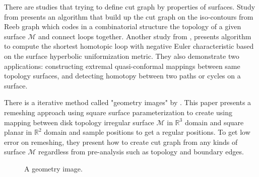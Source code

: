 \documentclass[a4paper,twoside]{article}
\begin{document}
There are studies that trying to define cut graph by properties of surfaces. Study from \cite{Patane:2007:FCB:1224804.1224947} presents an algorithm that build up the cut graph on the iso-contours from Reeb graph which codes in a combinatorial structure the topology of a given surface $\mathscr{M}$ and connect loops together. Another study from \cite{Jin:2013:CSH:2396897.2396971}, presents algorithm to compute the shortest homotopic loop with negative Euler characteristic based on the surface hyperbolic uniformization metric. They also demonstrate two applications: constructing extremal quasi-conformal mappings between same topology surfaces, and detecting homotopy between two paths or cycles on a surface. 

There is a iterative method called "geometry images" by \cite{Gu:2002:GI:566654.566589}. This paper presents a remeshing approach using square surface parameterization to create  using mapping between disk topology irregular surface $\mathscr{M}$ in $\mathbb{R}^3$ domain and square planar in $\mathbb{R}^2$ domain and sample positions to get a regular positions. To get low error on remeshing, they present how to create cut graph from any kinds of surface $\mathscr{M}$ regardless from pre-analysis such as topology and boundary edges.

\begin{figure}[!h]
	\centering
	
	\caption{A geometry image.}
	\label{fig:gim figure}
\end{figure}
\end{document}
